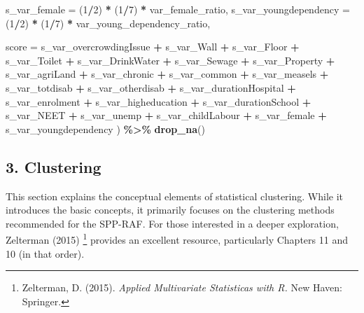\documentclass[
]{article}
\newenvironment{Shaded}{\begin{snugshade}}{\end{snugshade}}
\newcommand{\AttributeTok}[1]{\textcolor[rgb]{0.13,0.29,0.53}{#1}}
\newcommand{\DecValTok}[1]{\textcolor[rgb]{0.00,0.00,0.81}{#1}}
\newcommand{\FunctionTok}[1]{\textcolor[rgb]{0.13,0.29,0.53}{\textbf{#1}}}
\newcommand{\NormalTok}[1]{#1}
\newcommand{\SpecialCharTok}[1]{\textcolor[rgb]{0.81,0.36,0.00}{\textbf{#1}}}
\begin{document}
\begin{Shaded}
\begin{Highlighting}[]
    \AttributeTok{s\_var\_female =}\NormalTok{ (}\DecValTok{1}\SpecialCharTok{/}\DecValTok{2}\NormalTok{) }\SpecialCharTok{*}\NormalTok{ (}\DecValTok{1}\SpecialCharTok{/}\DecValTok{7}\NormalTok{) }\SpecialCharTok{*}\NormalTok{ var\_female\_ratio,}
    \AttributeTok{s\_var\_youngdependency =}\NormalTok{ (}\DecValTok{1}\SpecialCharTok{/}\DecValTok{2}\NormalTok{) }\SpecialCharTok{*}\NormalTok{ (}\DecValTok{1}\SpecialCharTok{/}\DecValTok{7}\NormalTok{) }\SpecialCharTok{*}\NormalTok{ var\_young\_dependency\_ratio,}
    
    \AttributeTok{score =}\NormalTok{ s\_var\_overcrowdingIssue }\SpecialCharTok{+}\NormalTok{ s\_var\_Wall }\SpecialCharTok{+}\NormalTok{ s\_var\_Floor }\SpecialCharTok{+}\NormalTok{ s\_var\_Toilet }\SpecialCharTok{+}\NormalTok{ s\_var\_DrinkWater }\SpecialCharTok{+}\NormalTok{ s\_var\_Sewage }\SpecialCharTok{+}
\NormalTok{      s\_var\_Property }\SpecialCharTok{+}\NormalTok{ s\_var\_agriLand }\SpecialCharTok{+}\NormalTok{ s\_var\_chronic }\SpecialCharTok{+}\NormalTok{ s\_var\_common }\SpecialCharTok{+}\NormalTok{ s\_var\_measels }\SpecialCharTok{+}\NormalTok{ s\_var\_totdisab }\SpecialCharTok{+}\NormalTok{ s\_var\_otherdisab }\SpecialCharTok{+}
\NormalTok{      s\_var\_durationHospital }\SpecialCharTok{+}\NormalTok{ s\_var\_enrolment }\SpecialCharTok{+}\NormalTok{ s\_var\_higheducation }\SpecialCharTok{+}\NormalTok{ s\_var\_durationSchool }\SpecialCharTok{+}\NormalTok{ s\_var\_NEET }\SpecialCharTok{+}\NormalTok{ s\_var\_unemp }\SpecialCharTok{+}
\NormalTok{      s\_var\_childLabour }\SpecialCharTok{+}\NormalTok{ s\_var\_female }\SpecialCharTok{+}\NormalTok{ s\_var\_youngdependency}
\NormalTok{  ) }\SpecialCharTok{\%\textgreater{}\%}
  \FunctionTok{drop\_na}\NormalTok{()}
\end{Highlighting}
\end{Shaded}

\subsection{\texorpdfstring{\textbf{3.
Clustering}}{3. Clustering}}\label{clustering}

This section explains the conceptual elements of statistical clustering.
While it introduces the basic concepts, it primarily focuses on the
clustering methods recommended for the SPP-RAF. For those interested in
a deeper exploration, Zelterman (2015) \footnote{Zelterman, D. (2015).
  \emph{Applied Multivariate Statisticas with R.} New Haven: Springer.}
provides an excellent resource, particularly Chapters 11 and 10 (in that
order).
\end{document}
